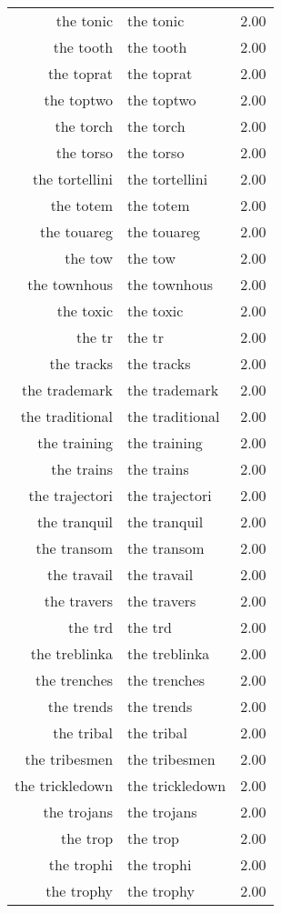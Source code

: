 \begin{table}[ht]
\begin{tabular}{rlr}
  the tonic & the tonic & 2.00 \\ 
  the tooth & the tooth & 2.00 \\ 
  the toprat & the toprat & 2.00 \\ 
  the toptwo & the toptwo & 2.00 \\ 
  the torch & the torch & 2.00 \\ 
  the torso & the torso & 2.00 \\ 
  the tortellini & the tortellini & 2.00 \\ 
  the totem & the totem & 2.00 \\ 
  the touareg & the touareg & 2.00 \\ 
  the tow & the tow & 2.00 \\ 
  the townhous & the townhous & 2.00 \\ 
  the toxic & the toxic & 2.00 \\ 
  the tr & the tr & 2.00 \\ 
  the tracks & the tracks & 2.00 \\ 
  the trademark & the trademark & 2.00 \\ 
  the traditional & the traditional & 2.00 \\ 
  the training & the training & 2.00 \\ 
  the trains & the trains & 2.00 \\ 
  the trajectori & the trajectori & 2.00 \\ 
  the tranquil & the tranquil & 2.00 \\ 
  the transom & the transom & 2.00 \\ 
  the travail & the travail & 2.00 \\ 
  the travers & the travers & 2.00 \\ 
  the trd & the trd & 2.00 \\ 
  the treblinka & the treblinka & 2.00 \\ 
  the trenches & the trenches & 2.00 \\ 
  the trends & the trends & 2.00 \\ 
  the tribal & the tribal & 2.00 \\ 
  the tribesmen & the tribesmen & 2.00 \\ 
  the trickledown & the trickledown & 2.00 \\ 
  the trojans & the trojans & 2.00 \\ 
  the trop & the trop & 2.00 \\ 
  the trophi & the trophi & 2.00 \\ 
  the trophy & the trophy & 2.00 \\ 

\end{tabular}
\end{table}
